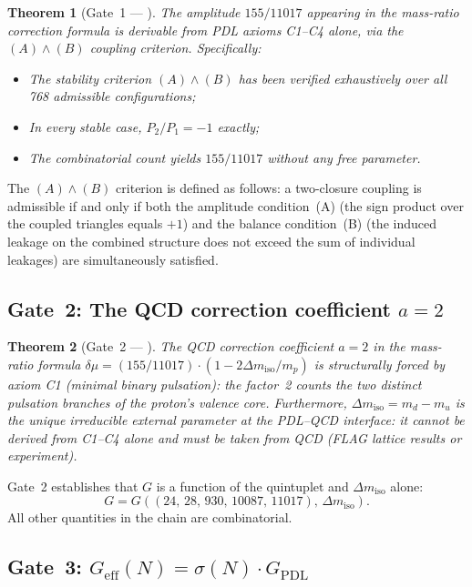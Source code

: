 \documentclass[11pt,a4paper]{article}
\theoremstyle{plain}
\newtheorem{theorem}{Theorem}[section]
\theoremstyle{definition}
\theoremstyle{remark}
\newcommand{\quintuplet}{(24,\,28,\,930,\,10087,\,11017)}
\newcommand{\Geff}{G_{\mathrm{eff}}}
\newcommand{\GPDL}{G_{\mathrm{PDL}}}
\newcommand{\sigmaN}{\sigma(N)}
\begin{document}
\begin{theorem}[Gate~1 — \citep{D29}]
\label{thm:Gate1}
The amplitude $155/11017$ appearing in the mass-ratio correction formula is derivable from PDL axioms C1--C4 alone, via the $(A)\wedge(B)$ coupling criterion.
Specifically:
\begin{itemize}
\item The stability criterion $(A)\wedge(B)$ has been verified exhaustively over all 768 admissible configurations;
\item In every stable case, $P_2/P_1 = -1$ exactly;
\item The combinatorial count yields $155/11017$ without any free parameter.
\end{itemize}
\end{theorem}

The $(A)\wedge(B)$ criterion is defined as follows: a two-closure coupling is admissible if and only if both the amplitude condition~(A) (the sign product over the coupled triangles equals $+1$) and the balance condition~(B) (the induced leakage on the combined structure does not exceed the sum of individual leakages) are simultaneously satisfied.

\subsection{Gate~2: The QCD correction coefficient \texorpdfstring{$a=2$}{a=2}}
\label{subsec:gate2}

\begin{theorem}[Gate~2 — \citep{D30}]
\label{thm:Gate2}
The QCD correction coefficient $a=2$ in the mass-ratio formula $\delta\mu = (155/11017)\cdot(1-2\Delta m_{\mathrm{iso}}/m_p)$ is structurally forced by axiom C1 (minimal binary pulsation): the factor~2 counts the two distinct pulsation branches of the proton's valence core.
Furthermore, $\Delta m_{\mathrm{iso}} = m_d - m_u$ is the unique irreducible external parameter at the PDL--QCD interface: it cannot be derived from C1--C4 alone and must be taken from QCD (FLAG lattice results or experiment).
\end{theorem}

Gate~2 establishes that $G$ is a function of the quintuplet and $\Delta m_{\mathrm{iso}}$ alone:
\[
G = G(\quintuplet,\, \Delta m_{\mathrm{iso}}).
\]
All other quantities in the chain are combinatorial.

\subsection{Gate~3: \texorpdfstring{$\Geff(N) = \sigmaN \cdot \GPDL$}{Geff(N) = sigmaN . GPDL}}
\label{subsec:gate3}
\end{document}
